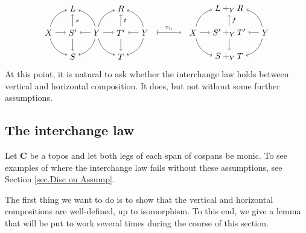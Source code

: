 \documentclass[11pt]{amsart}
\newcommand{\cat}[1]{\mathbf{#1}}
\theoremstyle{remark}
\theoremstyle{definition}
\begin{document}
\[
\begin{tikzpicture}
	\node (X) at (-5,0) {$X$};
	\node (Y) at (-3,0) {$Y$};
	\node (Z) at (-1,0) {$Y$};
	\node (L) at (-4,1) {$L$};
	\node (S') at (-4,0) {$S'$};
	\node (S) at (-4,-1) {$S$};
	\node (R) at (-2,1) {$R$};
	\node (T') at (-2,0) {$T'$};
	\node (T) at (-2,-1) {$T$};
	\draw [->] (X) edge[bend left=30] (L);
	\draw [->] (X) edge (S');
	\draw [->] (X) edge[bend right=30] (S);
	\draw [->] (Y) edge[bend right=30] (L);
	\draw [->] (Y) edge (S');
	\draw [->] (Y) edge[bend left=30] (S);
	\draw [->] (Y) edge[bend left=30] (R);
	\draw [->] (Y) edge (T');
	\draw [->] (Y) edge[bend right=30] (T);
	\draw [->] (Z) edge[bend right=30] (R);
	\draw [->] (Z) edge (T');
	\draw [->] (Z) edge[bend left=30] (T);
	\draw [font=\scriptsize,->] (S') edge node[right] {$s$} (L);
	\draw [->] (S') edge (S);
	\draw [font=\scriptsize,->] (T') edge node[right] {$t$} (R);
	\draw [->] (T') edge (T);
	\draw [font=\scriptsize,|->] (-0.5,0) -- node[above] {$\circ_h$} (0.5,0);
	\node (X) at (1,0) {$X$};
	\node (Y) at (4,0) {$Y$};
	\node (L) at (2.5,1) {$L+_YR$};
	\node (L') at (2.5,-1) {$S+_YT$};
	\node (Spb) at (2.5,0) {$S'+_YT'$};
	\draw [->] (X) edge[bend left=30] (L);
	\draw [->] (X) edge[] (Spb);
	\draw [->] (X) edge[bend right=30] (L');
	\draw [->] (Y) edge[bend right=30] (L);
	\draw [->] (Y) edge[] (Spb);
	\draw [->] (Y) edge[bend left=30] (L');
	\draw [font=\scriptsize,->] (Spb) edge node[right] {$f$} (L);
	\draw [->] (Spb) edge[] (L');
\end{tikzpicture}
\]
At this point, it is natural to ask whether the interchange law holds between vertical and horizontal composition. It does, but not without some further assumptions. 
%
%
%
%
%
%
\subsection{The interchange law}  %
%

Let $\cat{C}$ be a topos and let both legs of each span of cospans be monic. To see examples of where the interchange law fails without these assumptions, see Section \ref{sec.Disc on Assump}.

The first thing we want to do is to show that the vertical and horizontal compositions are well-defined, up to isomorphism. To this end, we give a lemma that will be put to work several times during the course of this section.
%
%
%
%
%
%
\end{document}
